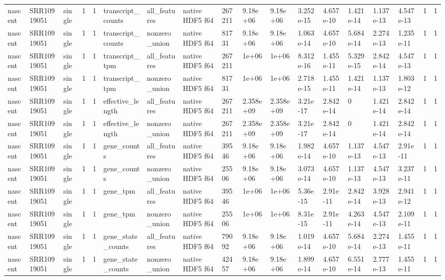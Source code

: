 \begin{tabular}{llllllllllllllllll}
nascent & SRR10919051 & single & 1 & 1 & transcript\_counts & all\_features & native HDF5 f64 & 267211 & 9.18e+06 & 9.18e+06 & 3.252e-15 & 4.657e-10 & 1.421e-14 & 1.137e-13 & 4.547e-13 & 1 & 1 \\
nascent & SRR10919051 & single & 1 & 1 & transcript\_counts & nonzero\_union & native HDF5 f64 & 81731 & 9.18e+06 & 9.18e+06 & 1.063e-14 & 4.657e-10 & 5.684e-14 & 2.274e-13 & 1.235e-11 & 1 & 1 \\
nascent & SRR10919051 & single & 1 & 1 & transcript\_tpm & all\_features & native HDF5 f64 & 267211 & 1e+06 & 1e+06 & 8.312e-16 & 1.455e-11 & 5.329e-15 & 2.842e-14 & 4.547e-13 & 1 & 1 \\
nascent & SRR10919051 & single & 1 & 1 & transcript\_tpm & nonzero\_union & native HDF5 f64 & 81731 & 1e+06 & 1e+06 & 2.718e-15 & 1.455e-11 & 1.421e-14 & 1.137e-13 & 1.803e-12 & 1 & 1 \\
nascent & SRR10919051 & single & 1 & 1 & effective\_length & all\_features & native HDF5 f64 & 267211 & 2.358e+09 & 2.358e+09 & 3.21e-17 & 2.842e-14 & 0 & 1.421e-14 & 2.842e-14 & 1 & 1 \\
nascent & SRR10919051 & single & 1 & 1 & effective\_length & nonzero\_union & native HDF5 f64 & 267211 & 2.358e+09 & 2.358e+09 & 3.21e-17 & 2.842e-14 & 0 & 1.421e-14 & 2.842e-14 & 1 & 1 \\
nascent & SRR10919051 & single & 1 & 1 & gene\_counts & all\_features & native HDF5 f64 & 39546 & 9.18e+06 & 9.18e+06 & 1.982e-14 & 4.657e-10 & 1.137e-13 & 4.547e-13 & 2.91e-11 & 1 & 1 \\
nascent & SRR10919051 & single & 1 & 1 & gene\_counts & nonzero\_union & native HDF5 f64 & 25506 & 9.18e+06 & 9.18e+06 & 3.073e-14 & 4.657e-10 & 1.137e-13 & 4.547e-13 & 3.237e-11 & 1 & 1 \\
nascent & SRR10919051 & single & 1 & 1 & gene\_tpm & all\_features & native HDF5 f64 & 39546 & 1e+06 & 1e+06 & 5.36e-15 & 2.91e-11 & 2.842e-14 & 3.928e-13 & 2.941e-12 & 1 & 1 \\
nascent & SRR10919051 & single & 1 & 1 & gene\_tpm & nonzero\_union & native HDF5 f64 & 25506 & 1e+06 & 1e+06 & 8.31e-15 & 2.91e-11 & 4.263e-14 & 4.547e-13 & 2.109e-11 & 1 & 1 \\
nascent & SRR10919051 & single & 1 & 1 & gene\_state\_counts & all\_features & native HDF5 f64 & 79092 & 9.18e+06 & 9.18e+06 & 1.019e-14 & 4.657e-10 & 5.684e-14 & 2.274e-13 & 1.455e-11 & 1 & 1 \\
nascent & SRR10919051 & single & 1 & 1 & gene\_state\_counts & nonzero\_union & native HDF5 f64 & 42457 & 9.18e+06 & 9.18e+06 & 1.899e-14 & 4.657e-10 & 6.551e-14 & 2.777e-13 & 1.455e-11 & 1 & 1 \\

\end{tabular}
